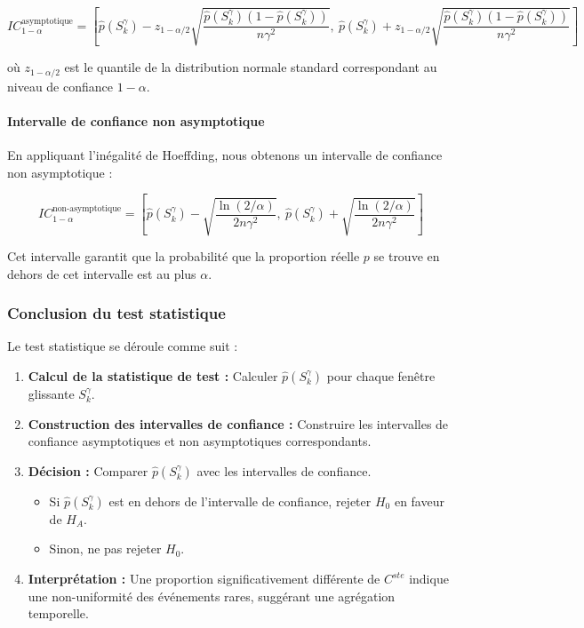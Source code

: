 \documentclass[12pt,a4paper]{article}
\theoremstyle{definition}
\theoremstyle{remark}
\begin{document}
$$
IC_{1 - \alpha}^{\text{asymptotique}} = \left[ \hat{p}(S_k^{\gamma}) - z_{1 - \alpha/2} \sqrt{\frac{\hat{p}(S_k^{\gamma})(1 - \hat{p}(S_k^{\gamma}))}{n \gamma^2}}, \ \hat{p}(S_k^{\gamma}) + z_{1 - \alpha/2} \sqrt{\frac{\hat{p}(S_k^{\gamma})(1 - \hat{p}(S_k^{\gamma}))}{n \gamma^2}} \right]
$$

où $z_{1 - \alpha/2}$ est le quantile de la distribution normale standard correspondant au niveau de confiance $1 - \alpha$.

\paragraph{Intervalle de confiance non asymptotique}

En appliquant l'inégalité de Hoeffding, nous obtenons un intervalle de confiance non asymptotique :

$$
IC_{1 - \alpha}^{\text{non-asymptotique}} = \left[ \hat{p}(S_k^{\gamma}) - \sqrt{\frac{\ln(2/\alpha)}{2 n \gamma^2}}, \ \hat{p}(S_k^{\gamma}) + \sqrt{\frac{\ln(2/\alpha)}{2 n \gamma^2}} \right]
$$

Cet intervalle garantit que la probabilité que la proportion réelle $p$ se trouve en dehors de cet intervalle est au plus $\alpha$.

\subsubsection{Conclusion du test statistique}

Le test statistique se déroule comme suit :

\begin{enumerate}
    \item \textbf{Calcul de la statistique de test :} Calculer $\hat{p}(S_k^{\gamma})$ pour chaque fenêtre glissante $S_k^{\gamma}$.
    \item \textbf{Construction des intervalles de confiance :} Construire les intervalles de confiance asymptotiques et non asymptotiques correspondants.
    \item \textbf{Décision :} Comparer $\hat{p}(S_k^{\gamma})$ avec les intervalles de confiance.
    \begin{itemize}
        \item Si $\hat{p}(S_k^{\gamma})$ est en dehors de l'intervalle de confiance, rejeter $H_0$ en faveur de $H_A$.
        \item Sinon, ne pas rejeter $H_0$.
    \end{itemize}
    \item \textbf{Interprétation :} Une proportion significativement différente de $C^{ste}$ indique une non-uniformité des événements rares, suggérant une agrégation temporelle.
\end{enumerate}
\end{document}
